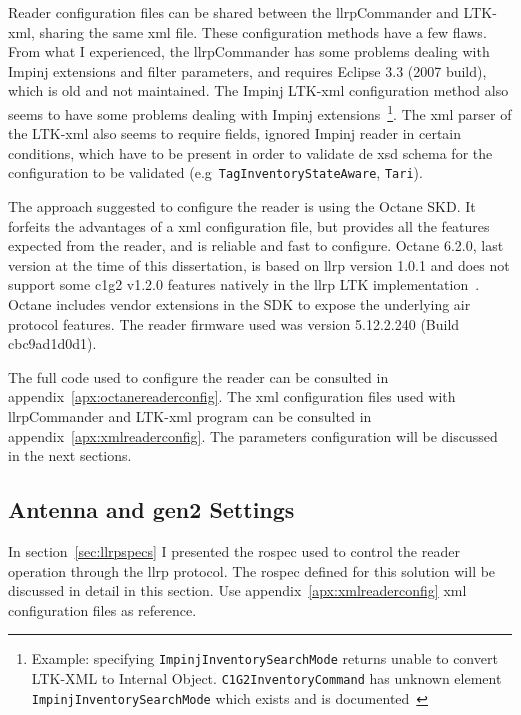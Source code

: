 Reader configuration files can be shared between the \acs{llrp}Commander and LTK-\ac{xml}, sharing the same \ac{xml} file. These configuration methods have a few flaws. From what I experienced, the \ac{llrp}Commander has some problems dealing with Impinj extensions and filter parameters, and requires Eclipse $3.3$ (2007 build), which is old and not maintained.
The Impinj LTK-\ac{xml} configuration method also seems to have some problems dealing with Impinj extensions~\footnote{Example: specifying \texttt{ImpinjInventorySearchMode} returns unable to convert LTK-XML to Internal Object. \texttt{C1G2InventoryCommand} has unknown element \texttt{ImpinjInventorySearchMode} which exists and is documented~\cite{ImpinjLTKProgrammers}}.
The \ac{xml} parser of the LTK-\acs{xml} also seems to require fields, ignored Impinj reader in certain conditions, which have to be present in order to validate de \ac{xsd} schema for the configuration to be validated (e.g\ \texttt{TagInventoryStateAware}, \texttt{Tari}).

The approach suggested to configure the reader is using the Octane SKD. It forfeits the advantages of a \ac{xml} configuration file, but provides all the features expected from the reader, and is reliable and fast to configure.
Octane 6.2.0, last version at the time of this dissertation, is based on \ac{llrp} version 1.0.1 and does not support some \ac{c1g2} v1.2.0 features natively in the \ac{llrp} LTK implementation~\cite{ImpinjOctaneLLRP}. Octane includes vendor extensions in the SDK to expose the underlying air protocol features.
The reader firmware used was version 5.12.2.240 (Build cbc9ad1d0d1).

The full code used to configure the reader can be consulted in appendix~\ref{apx:octanereaderconfig}.
The \ac{xml} configuration files used with \ac{llrp}Commander and LTK-\acs{xml} program can be consulted in appendix~\ref{apx:xmlreaderconfig}.
The parameters configuration will be discussed in the next sections.

\subsection{Antenna and \acs{gen2} Settings}

In section~\ref{sec:llrpspecs} I presented the \ac{rospec} used to control the reader operation through the \ac{llrp} protocol. The \ac{rospec} defined for this solution will be discussed in detail in this section.
Use appendix~\ref{apx:xmlreaderconfig} \ac{xml} configuration files as reference.

